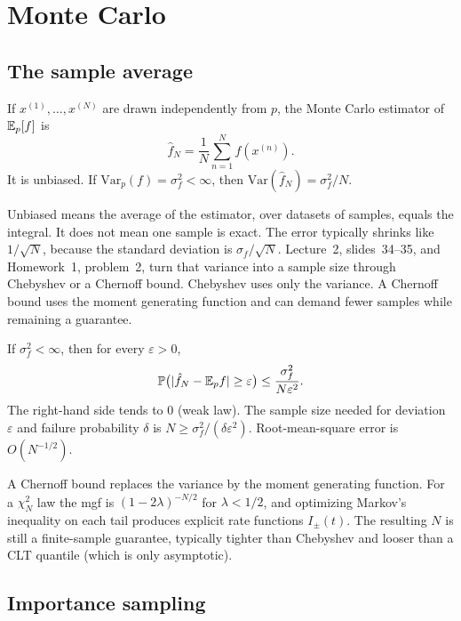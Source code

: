 \chapter{Monte Carlo}
\label{ch:mc}

\section{The sample average}

\begin{defbox}
If $x^{(1)},\ldots,x^{(N)}$ are drawn independently from $p$, the Monte Carlo estimator of $\mathbb{E}_p[f]$ is
\[
\hat f_N=\frac1N\sum_{n=1}^N f(x^{(n)}).
\]
It is unbiased. If $\mathrm{Var}_p(f)=\sigma_f^2<\infty$, then $\mathrm{Var}(\hat f_N)=\sigma_f^2/N$.
\end{defbox}

\begin{intbox}
Unbiased means the average of the estimator, over datasets of samples, equals the integral. It does not mean one sample is exact. The error typically shrinks like $1/\sqrt{N}$, because the standard deviation is $\sigma_f/\sqrt{N}$. Lecture~2, slides~34--35, and Homework~1, problem~2, turn that variance into a sample size through Chebyshev or a Chernoff bound. Chebyshev uses only the variance. A Chernoff bound uses the moment generating function and can demand fewer samples while remaining a guarantee.
\end{intbox}

\begin{resultbox}
If $\sigma_f^2<\infty$, then for every $\varepsilon>0$,
\[
\mathbb P\bigl(|\hat f_N-\mathbb{E}_p f|\ge\varepsilon\bigr)\le\frac{\sigma_f^2}{N\varepsilon^2}.
\]
The right-hand side tends to $0$ (weak law). The sample size needed for deviation $\varepsilon$ and failure probability $\delta$ is $N\ge\sigma_f^2/(\delta\varepsilon^2)$. Root-mean-square error is $O(N^{-1/2})$.
\end{resultbox}

A Chernoff bound replaces the variance by the moment generating function. For a $\chi^2_N$ law the mgf is $(1-2\lambda)^{-N/2}$ for $\lambda<1/2$, and optimizing Markov's inequality on each tail produces explicit rate functions $I_\pm(t)$. The resulting $N$ is still a finite-sample guarantee, typically tighter than Chebyshev and looser than a CLT quantile (which is only asymptotic).

\section{Importance sampling}

